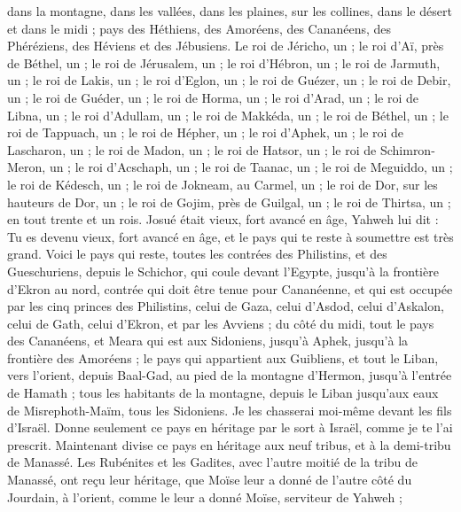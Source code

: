 \begin{multicols}{2}
dans la montagne, dans les vallées, dans les plaines, sur les collines, dans le désert et dans le midi ; pays des Héthiens, des Amoréens, des Cananéens, des Phéréziens, des Héviens et des Jébusiens.
Le roi de Jéricho, un ; le roi d’Aï, près de Béthel, un ;
le roi de Jérusalem, un ; le roi d’Hébron, un ;
le roi de Jarmuth, un ; le roi de Lakis, un ;
le roi d’Eglon, un ; le roi de Guézer, un ;
le roi de Debir, un ; le roi de Guéder, un ;
le roi de Horma, un ; le roi d’Arad, un ;
le roi de Libna, un ; le roi d’Adullam, un ;
le roi de Makkéda, un ; le roi de Béthel, un ;
le roi de Tappuach, un ; le roi de Hépher, un ;
le roi d’Aphek, un ; le roi de Lascharon, un ;
le roi de Madon, un ; le roi de Hatsor, un ;
le roi de Schimron-Meron, un ; le roi d’Acschaph, un ;
le roi de Taanac, un ; le roi de Meguiddo, un ;
le roi de Kédesch, un ; le roi de Jokneam, au Carmel, un ;
le roi de Dor, sur les hauteurs de Dor, un ; le roi de Gojim, près de Guilgal, un ;
le roi de Thirtsa, un ; en tout trente et un rois.
\VerseOne{}Josué était vieux, fort avancé en âge, Yahweh lui dit : Tu es devenu vieux, fort avancé en âge, et le pays qui te reste à soumettre est très grand.
Voici le pays qui reste, toutes les contrées des Philistins, et des Gueschuriens,
depuis le Schichor, qui coule devant l’Egypte, jusqu’à la frontière d’Ekron au nord, contrée qui doit être tenue pour Cananéenne, et qui est occupée par les cinq princes des Philistins, celui de Gaza, celui d’Asdod, celui d’Askalon, celui de Gath, celui d’Ekron, et par les Avviens ;
du côté du midi, tout le pays des Cananéens, et Meara qui est aux Sidoniens, jusqu’à Aphek, jusqu’à la frontière des Amoréens ;
le pays qui appartient aux Guibliens, et tout le Liban, vers l’orient, depuis Baal-Gad, au pied de la montagne d’Hermon, jusqu’à l’entrée de Hamath ;
tous les habitants de la montagne, depuis le Liban jusqu’aux eaux de Misrephoth-Maïm, tous les Sidoniens. Je les chasserai moi-même devant les fils d’Israël. Donne seulement ce pays en héritage par le sort à Israël, comme je te l’ai prescrit.
Maintenant divise ce pays en héritage aux neuf tribus, et à la demi-tribu de Manassé.
Les Rubénites et les Gadites, avec l’autre moitié de la tribu de Manassé, ont reçu leur héritage, que Moïse leur a donné de l’autre côté du Jourdain, à l’orient, comme le leur a donné Moïse, serviteur de Yahweh ;

\end{multicols}
